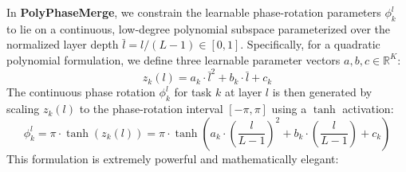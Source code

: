 \documentclass{article}
\theoremstyle{plain}
\theoremstyle{definition}
\theoremstyle{remark}
\begin{document}
In \textbf{PolyPhaseMerge}, we constrain the learnable phase-rotation parameters $\phi_k^l$ to lie on a continuous, low-degree polynomial subspace parameterized over the normalized layer depth $\bar{l} = l / (L-1) \in [0, 1]$. Specifically, for a quadratic polynomial formulation, we define three learnable parameter vectors $a, b, c \in \mathbb{R}^K$:
\begin{equation}
    z_k(l) = a_k \cdot \bar{l}^2 + b_k \cdot \bar{l} + c_k
\end{equation}
The continuous phase rotation $\phi_k^l$ for task $k$ at layer $l$ is then generated by scaling $z_k(l)$ to the phase-rotation interval $[-\pi, \pi]$ using a $\tanh$ activation:
\begin{equation}
    \phi_k^l = \pi \cdot \tanh\left( z_k(l) \right) = \pi \cdot \tanh\left( a_k \cdot \left(\frac{l}{L-1}\right)^2 + b_k \cdot \left(\frac{l}{L-1}\right) + c_k \right)
\end{equation}
This formulation is extremely powerful and mathematically elegant:
\end{document}
